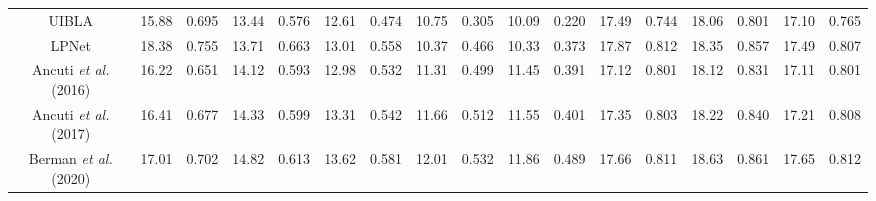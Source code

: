 \documentclass[journal]{IEEEtran}
\begin{document}
\begin{table}[htbp]
{\begin{tabular}{|c|cc|cc|cc|cc|cc|cc|cc|cc|}
UIBLA \cite{blurriness-based}                       & 15.88                        & 0.695                        & 13.44                        & 0.576                        & 12.61                        & 0.474                        & 10.75                        & 0.305                        & 10.09                        & 0.220                        & 17.49                        & 0.744                        & 18.06                        & 0.801                        & 17.10                        & 0.765                        \\
LPNet \cite{fu2019lightweight}                      & 18.38                        & 0.755                        & 13.71                        & 0.663                        & 13.01                        & 0.558                        & 10.37                        & 0.466                        & 10.33                        & 0.373                        & 17.87                        & 0.812                        & 18.35                        & 0.857                        & 17.49                        & 0.807                        \\
Ancuti \textit{et al.}(2016) \cite{ancuti2016multi}                        & 16.22                        & 0.651                        & 14.12                        & 0.593                        & 12.98                        & 0.532                        & 11.31                        & 0.499                        & 11.45                        & 0.391                        & 17.12                        & 0.801                        & 18.12                        & 0.831                        & 17.11                        & 0.801                        \\
Ancuti \textit{et al.}(2017) \cite{ancuti2017color}                      & 16.41                        & 0.677                        & 14.33                        & 0.599                        & 13.31                        & 0.542                        & 11.66
& 0.512                        & 11.55                        & 0.401                        & 17.35                        & 0.803                        & 18.22
& 0.840                        & 17.21                        & 0.808 \\
Berman \textit{et al.}(2020) \cite{berman2020underwater}                       & 17.01                        & 0.702                        & 14.82                        & 0.613                        & 13.62                        & 0.581                        & 12.01                        & 0.532                       & 11.86                        & 0.489                        & 17.66                        & 0.811                        & 18.63                        & 0.861                        & 17.65                        & 0.812                        \\

\end{tabular}}
\end{table}
\end{document}
